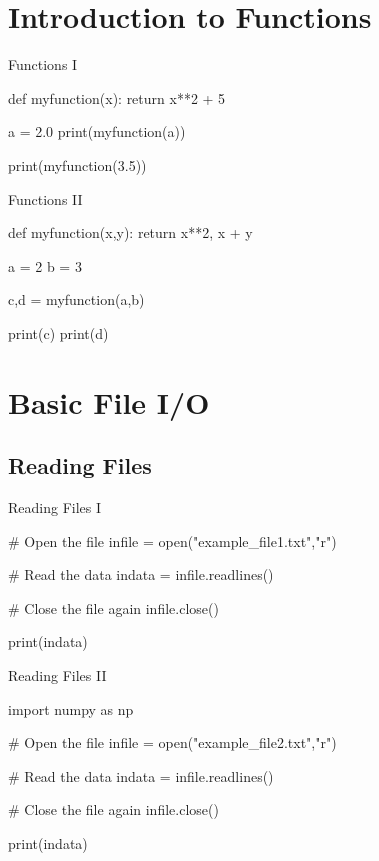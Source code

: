 \documentclass[11pt]{beamer}
\begin{document}
\section{Introduction to Functions}
\begin{frame}[fragile]{Functions I}
\begin{semiverbatim}
def myfunction(x):
    return x**2 + 5

a = 2.0
print(myfunction(a))

print(myfunction(3.5))
\end{semiverbatim}
\end{frame}

\begin{frame}[fragile]{Functions II}
\begin{semiverbatim}
def myfunction(x,y):
	return x**2, x + y

a = 2
b = 3

c,d = myfunction(a,b)

print(c)
print(d)
\end{semiverbatim}
\end{frame}

\section{Basic File I/O}
\subsection{Reading Files}
\begin{frame}[fragile]{Reading Files I}
\begin{semiverbatim}
# Open the file
infile = open("example_file1.txt","r")

# Read the data
indata = infile.readlines()

# Close the file again
infile.close()

print(indata)
\end{semiverbatim}
\end{frame}

\begin{frame}[fragile]{Reading Files II}
\begin{semiverbatim}
import numpy as np

# Open the file
infile = open("example_file2.txt","r")

# Read the data
indata = infile.readlines()

# Close the file again
infile.close()

print(indata)
\end{semiverbatim}
\end{frame}
\end{document}
